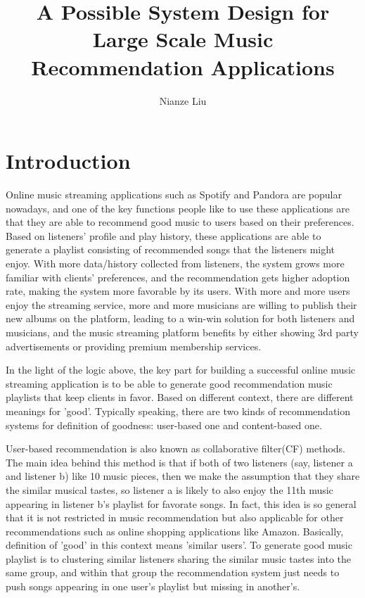 \documentclass[jou]{apa6}
\title{A Possible System Design for Large Scale Music Recommendation Applications}
\author{Nianze Liu}
\affiliation{New York University}
\begin{document}
\maketitle

\section{Introduction}
Online music streaming applications such as Spotify and Pandora are popular
nowadays, and one of the key functions people like to use these applications 
are that they are able to recommend good music to users based on their preferences. 
Based on listeners' profile and play history, these applications are able to generate
a playlist consisting of recommended songs that the listeners might enjoy. With more 
data/history collected from listeners, the system grows more familiar with clients'
preferences, and the recommendation gets higher adoption rate, making the system more 
favorable by its users. With more and more users enjoy the streaming service, 
more and more musicians are willing to publish their new albums on the platform, 
leading to a win-win solution for both listeners and musicians, and the music
streaming platform benefits by either showing 3rd party advertisements or 
providing premium membership services.

In the light of the logic above, the key part for building a successful online music 
streaming application is to be able to generate good recommendation music playlists 
that keep clients in favor. Based on different context, there are different meanings 
for 'good'. Typically speaking, there are two kinds of recommendation systems for 
definition of goodness: user-based one and content-based one. 

User-based recommendation is also known as collaborative filter(CF) methods. 
The main idea behind this method is that if both of two listeners 
(say, \textsf{listener a} and \textsf{listener b}) like 10 music pieces, then we make the assumption that
they share the similar musical tastes, so \textsf{listener a} is likely to also enjoy 
the 11th music appearing in \textsf{listener b}'s playlist for favorate songs. 
In fact, this idea is so general that it is not restricted in music recommendation but
also applicable for other recommendations such as online shopping applications like Amazon. 
Basically, definition of 'good' in this context means 'similar users'. To generate good 
music playlist is to clustering similar listeners sharing the similar music tastes 
into the same group, and within that group the recommendation system just needs to 
push songs appearing in one user's playlist but missing in another's.
\end{document}
